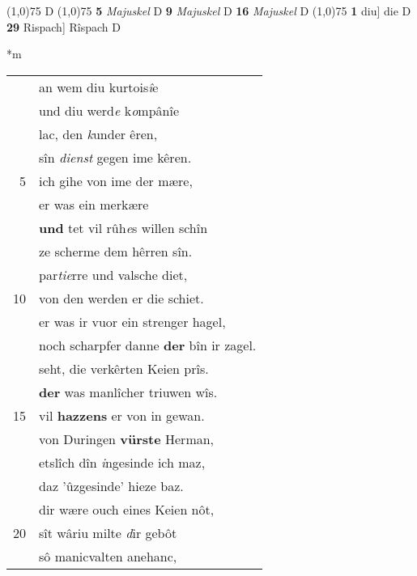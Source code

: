 \documentclass[8pt,a4paper,notitlepage]{article}
\begin{document}
\begin{table}[ht]
\begin{minipage}[t]{0.5\linewidth}
\begin{tabular}{rl}
\end{tabular}
\scriptsize
\line(1,0){75} \newline
D \newline
\line(1,0){75} \newline
\textbf{5} \textit{Majuskel} D  \textbf{9} \textit{Majuskel} D  \textbf{16} \textit{Majuskel} D  \newline
\line(1,0){75} \newline
\textbf{1} diu] die D \textbf{29} Rispach] Rîspach D \newline
\end{minipage}
\hspace{0.5cm}
\begin{minipage}[t]{0.5\linewidth}
\small
\begin{center}*m
\end{center}
\begin{tabular}{rl}
 & an wem diu kurtois\textit{î}e\\ 
 & und diu werd\textit{e} k\textit{o}mpânîe\\ 
 & lac, den \textit{k}under êren,\\ 
 & sîn \textit{dienst} gegen ime kêren.\\ 
5 & ich gihe von ime der mære,\\ 
 & er was ein merkære\\ 
 & \textbf{und} tet vil rûh\textit{e}s willen schîn\\ 
 & ze scherme dem hêrren sîn.\\ 
 & par\textit{tie}rre und valsche diet,\\ 
10 & von den werden er die schiet.\\ 
 & er was ir vuor ein strenger hagel,\\ 
 & noch scharpfer danne \textbf{der} bîn ir zagel.\\ 
 & seht, die verkêrten Keien prîs.\\ 
 & \textbf{der} was manlîcher triuwen wîs.\\ 
15 & vil \textbf{hazzens} er von in gewan.\\ 
 & von Duringen \textbf{vürste} Herman,\\ 
 & etslîch dîn \textit{i}ngesinde ich maz,\\ 
 & daz 'ûzgesinde' hieze baz.\\ 
 & dir wære ouch eines Keien nôt,\\ 
20 & sît wâriu milte \textit{d}ir gebôt\\ 
 & sô manicvalten anehanc,\\ 

\end{tabular}
\end{minipage}
\end{table}
\end{document}
